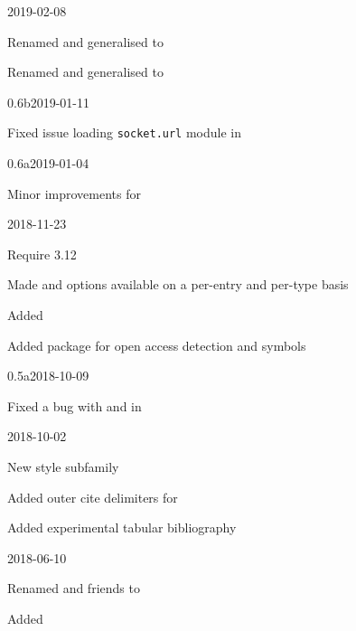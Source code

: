 \documentclass[DIV=9]{scrartcl}
\begin{document}
\begin{changelog}
\begin{release}{0.7}{2019-02-08}
  \item Renamed and generalised  to
  \item Renamed and generalised  to
\end{release}
\begin{release}{0.6b}{2019-01-11}
  \item Fixed issue loading \texttt{socket.url} module in
\end{release}
\begin{release}{0.6a}{2019-01-04}
  \item Minor improvements for 
\end{release}
\begin{release}{0.6}{2018-11-23}
  \item Require  3.12
  \item Made  and  options available on a
    per-entry and per-type basis
  \item Added 
  \item Added  package for open access detection and
    symbols
\end{release}
\begin{release}{0.5a}{2018-10-09}
  \item Fixed a bug with  and  in
\end{release}
\begin{release}{0.5}{2018-10-02}
  \item New  style
    subfamily
  \item Added outer cite delimiters for 
  \item Added experimental tabular bibliography
\end{release}
\begin{release}{0.4}{2018-06-10}
  \item Renamed  and friends to
  \item Added 

\end{release}
\end{changelog}
\end{document}
